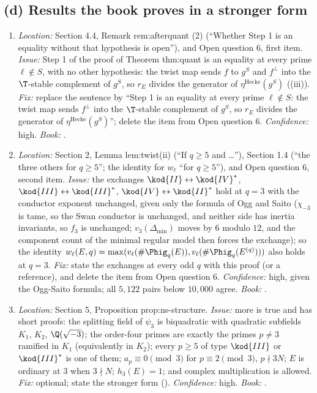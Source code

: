 \begin{sloppypar}
\subsection*{(d) Results the book proves in a stronger form}
\begin{enumerate}[resume*=errata]
\item\label{err:paper:step1} \emph{Location:} Section 4.4, Remark rem:afterquant (2) (``Whether Step 1 is an equality without that hypothesis is open''), and Open question 6, first item. \emph{Issue:} Step 1 of the
proof of Theorem thm:quant is an equality at every prime $\ell\notin S$, with no other hypothesis: the twist map sends $f$ to $g^S$ and $f^\perp$ into the $\T$-stable complement of $g^S$, so $r_E$
divides the generator of $\eta^{\mathrm{Hecke}}(g^S)$ ((iii)). \emph{Fix:} replace the sentence by ``Step 1 is an equality at every prime $\ell\notin S$: the twist map sends $f^\perp$ into the
$\T$-stable complement of $g^S$, so $r_E$ divides the generator of $\eta^{\mathrm{Hecke}}(g^S)$''; delete the item from Open question 6. \emph{Confidence:} high. \emph{Book:} .
\item\label{err:paper:twist-at-3} \emph{Location:} Section 2, Lemma lem:twist(ii) (``If $q\ge5$ and \dots''), Section 1.4 (``the three others for $q\ge5$''; the identity for $w_\ell$ ``for $q\ge5$''), and Open
question 6, second item. \emph{Issue:} the exchanges $\kod{II}\leftrightarrow\kod{IV}^*$, $\kod{III}\leftrightarrow\kod{III}^*$, $\kod{IV}\leftrightarrow\kod{II}^*$ hold at $q=3$ with the conductor exponent unchanged, given only the formula of
Ogg and Saito ($\chi_{-3}$ is tame, so the Swan conductor is unchanged, and neither side has inertia invariants, so $f_3$ is unchanged; $v_3(\Delta_{\min})$ moves by $6$ modulo $12$, and the component count of the minimal regular model then forces the
exchange); so the identity $w_\ell(E,q)=\max(v_\ell(\#\Phig_q(E)),v_\ell(\#\Phig_q(E^{(q)})))$ also holds at $q=3$. \emph{Fix:} state the exchanges at every odd $q$ with this proof (or a reference), and delete
the item from Open question 6. \emph{Confidence:} high, given the Ogg-Saito formula; all $5{,}122$ pairs below $10{,}000$ agree. \emph{Book:} .
\item\label{err:paper:ns-structure} \emph{Location:} Section 5, Proposition prop:ns-structure. \emph{Issue:} more is true and has short proofs: the splitting field of $\psi_3$ is biquadratic with quadratic
subfields $K_1$, $K_2$, $\Q(\sqrt{-3})$; the order-four primes are exactly the primes $p\ne3$ ramified in $K_1$ (equivalently in $K_2$); every $p\ge5$ of type $\kod{III}$ or $\kod{III}^*$ is one of them;
$a_p\equiv0\pmod3$ for $p\equiv2\pmod3$, $p\nmid3N$; $E$ is ordinary at $3$ when $3\nmid N$; $h_3(E)=1$; and complex multiplication is allowed. \emph{Fix:} optional; state the stronger form
(). \emph{Confidence:} high. \emph{Book:} .
\end{enumerate}


\end{sloppypar}
